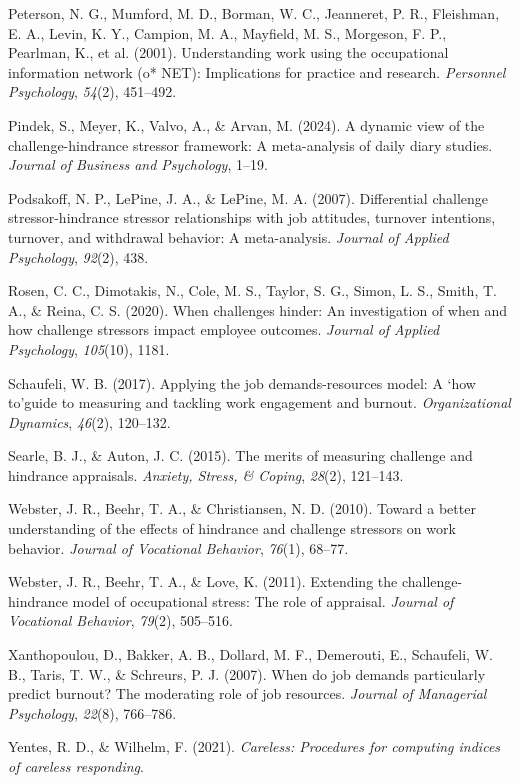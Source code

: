 \documentclass[
  man]{apa7}
\newlength{\cslhangindent}
\newenvironment{CSLReferences}[2] %
 {\begin{list}{}{%
  \setlength{\itemindent}{0pt}
  \setlength{\leftmargin}{0pt}
  \setlength{\parsep}{0pt}
  \ifodd #1
   \setlength{\leftmargin}{\cslhangindent}
   \setlength{\itemindent}{-1\cslhangindent}
  \fi
  \setlength{\itemsep}{#2\baselineskip}}}
 {\end{list}}
\begin{document}
\begin{CSLReferences}{1}{0}
Peterson, N. G., Mumford, M. D., Borman, W. C., Jeanneret, P. R., Fleishman, E. A., Levin, K. Y., Campion, M. A., Mayfield, M. S., Morgeson, F. P., Pearlman, K., et al. (2001). Understanding work using the occupational information network (o* NET): Implications for practice and research. \emph{Personnel Psychology}, \emph{54}(2), 451--492.

Pindek, S., Meyer, K., Valvo, A., \& Arvan, M. (2024). A dynamic view of the challenge-hindrance stressor framework: A meta-analysis of daily diary studies. \emph{Journal of Business and Psychology}, 1--19.

Podsakoff, N. P., LePine, J. A., \& LePine, M. A. (2007). Differential challenge stressor-hindrance stressor relationships with job attitudes, turnover intentions, turnover, and withdrawal behavior: A meta-analysis. \emph{Journal of Applied Psychology}, \emph{92}(2), 438.

Rosen, C. C., Dimotakis, N., Cole, M. S., Taylor, S. G., Simon, L. S., Smith, T. A., \& Reina, C. S. (2020). When challenges hinder: An investigation of when and how challenge stressors impact employee outcomes. \emph{Journal of Applied Psychology}, \emph{105}(10), 1181.

Schaufeli, W. B. (2017). Applying the job demands-resources model: A `how to'guide to measuring and tackling work engagement and burnout. \emph{Organizational Dynamics}, \emph{46}(2), 120--132.

Searle, B. J., \& Auton, J. C. (2015). The merits of measuring challenge and hindrance appraisals. \emph{Anxiety, Stress, \& Coping}, \emph{28}(2), 121--143.

Webster, J. R., Beehr, T. A., \& Christiansen, N. D. (2010). Toward a better understanding of the effects of hindrance and challenge stressors on work behavior. \emph{Journal of Vocational Behavior}, \emph{76}(1), 68--77.

Webster, J. R., Beehr, T. A., \& Love, K. (2011). Extending the challenge-hindrance model of occupational stress: The role of appraisal. \emph{Journal of Vocational Behavior}, \emph{79}(2), 505--516.

Xanthopoulou, D., Bakker, A. B., Dollard, M. F., Demerouti, E., Schaufeli, W. B., Taris, T. W., \& Schreurs, P. J. (2007). When do job demands particularly predict burnout? The moderating role of job resources. \emph{Journal of Managerial Psychology}, \emph{22}(8), 766--786.

Yentes, R. D., \& Wilhelm, F. (2021). \emph{Careless: Procedures for computing indices of careless responding}.

\end{CSLReferences}

\endgroup
\end{document}
